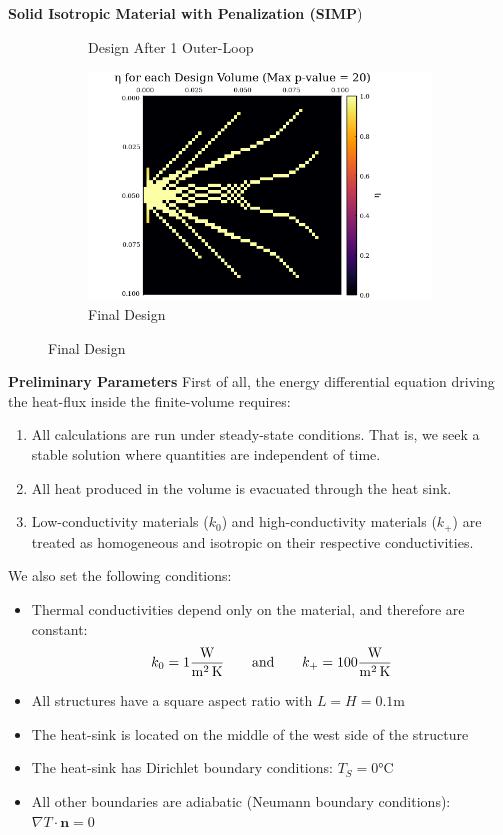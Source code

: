 \documentclass[final]{beamer}
\begin{document}
\begin{frame}{\textbf{Solid Isotropic Material with Penalization (SIMP})}
\begin{figure}
\begin{subfigure}{0.45\linewidth}
			\caption{Design After 1 Outer-Loop}
		\end{subfigure}
		\begin{subfigure}{0.45\linewidth}
			\includegraphics[width=\linewidth]{60x60-Final_Design.png}
			\caption{Final Design}
		\end{subfigure}
	\end{figure}
\end{frame}

{\footnotesize
\begin{frame}[t]{\textbf{Preliminary Parameters}}
	First of all, the energy differential equation driving the heat-flux inside the finite-volume requires:
	\begin{enumerate}
		\item All calculations are run under steady-state conditions. That is, we seek a stable solution where quantities are independent of time.
		\item All heat produced in the volume is evacuated through the heat sink.
		\item Low-conductivity materials ($k_0$) and high-conductivity materials ($k_+$) are treated as homogeneous and isotropic on their respective conductivities.
	\end{enumerate}\pause
	We also set the following conditions:
	\begin{itemize}
		\item Thermal conductivities depend only on the material, and therefore are constant:
		$$k_0=1 \si[per-mode=fraction]{\watt\per\square\meter\per\kelvin}\qquad\text{and}\qquad k_+=100 \si[per-mode=fraction]{\watt\per\square\meter\per\kelvin}$$
		\item All structures have a square aspect ratio with $L=H=0.1\si{\meter}$
		\item The heat-sink is located on the middle of the west side of the structure
		\item The heat-sink has Dirichlet boundary conditions: $T_S=0\si{\celsius}$
		\item All other boundaries are adiabatic (Neumann boundary conditions): $\nabla T\cdot\mathbf{n}=0$
	\end{itemize}
\end{frame}
}
\end{document}
